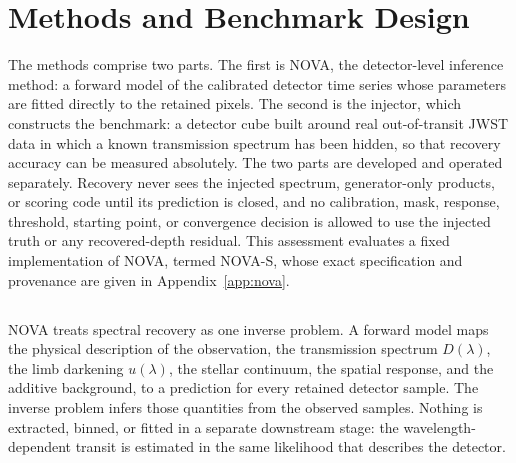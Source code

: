 \section{Methods and Benchmark Design}
\label{sec:methods}


The methods comprise two parts. The first is NOVA, the detector-level
inference method: a forward model of the calibrated detector time series
whose parameters are fitted directly to the retained pixels. The second is
the injector, which constructs the benchmark: a detector cube built around
real out-of-transit JWST data in which a known transmission spectrum has
been hidden, so that recovery accuracy can be measured absolutely. The two
parts are developed and operated separately. Recovery never sees the
injected spectrum, generator-only products, or scoring code until its
prediction is closed, and no calibration, mask, response, threshold,
starting point, or convergence decision is allowed to use the injected
truth or any recovered-depth residual. This assessment evaluates a fixed
implementation of NOVA, termed NOVA-S, whose exact specification and
provenance are given in Appendix~\ref{app:nova}.

\subsection{\nova{}}


NOVA treats spectral recovery as one inverse problem. A forward model maps
the physical description of the observation, the transmission spectrum
$D(\lambda)$, the limb darkening $u(\lambda)$, the stellar continuum, the
spatial response, and the additive background, to a prediction for every
retained detector sample. The inverse problem infers those quantities from
the observed samples. Nothing is extracted, binned, or fitted in a
separate downstream stage: the wavelength-dependent transit is estimated
in the same likelihood that describes the detector.

